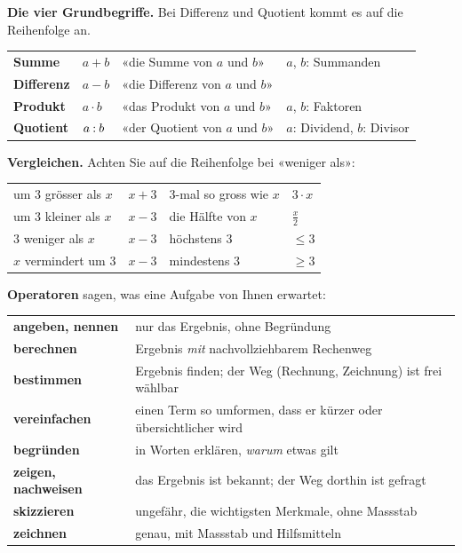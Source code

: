 \documentclass[11pt]{exam}
\begin{document}
\begin{merke}
\textbf{Die vier Grundbegriffe.} Bei Differenz und Quotient kommt es auf die
Reihenfolge an.

\begin{center}
\renewcommand{\arraystretch}{1.3}
\begin{tabular}{llll}
  \textbf{Summe}      & $a + b$           & «die Summe von $a$ und $b$»      & $a$, $b$: Summanden \\
  \textbf{Differenz}  & $a - b$           & «die Differenz von $a$ und $b$»  & \\
  \textbf{Produkt}    & $a \cdot b$       & «das Produkt von $a$ und $b$»    & $a$, $b$: Faktoren \\
  \textbf{Quotient}   & $a \mathbin{:} b$    & «der Quotient von $a$ und $b$»   & $a$: Dividend, $b$: Divisor
\end{tabular}
\end{center}

\textbf{Vergleichen.} Achten Sie auf die Reihenfolge bei «weniger als»:

\begin{center}
\renewcommand{\arraystretch}{1.3}
\begin{tabular}{ll@{\qquad}ll}
  um $3$ grösser als $x$      & $x + 3$  & $3$-mal so gross wie $x$ & $3 \cdot x$ \\
  um $3$ kleiner als $x$      & $x - 3$  & die Hälfte von $x$       & $\frac{x}{2}$ \\
  $3$ weniger als $x$         & $x - 3$  & höchstens $3$            & $\leq 3$ \\
  $x$ vermindert um $3$       & $x - 3$  & mindestens $3$           & $\geq 3$
\end{tabular}
\end{center}
\end{merke}

\begin{merke}
\textbf{Operatoren} sagen, was eine Aufgabe von Ihnen erwartet:

\begin{center}
\renewcommand{\arraystretch}{1.3}
\begin{tabular}{@{}lp{11cm}@{}}
  \textbf{angeben, nennen}   & nur das Ergebnis, ohne Begründung \\
  \textbf{berechnen}         & Ergebnis \emph{mit} nachvollziehbarem Rechenweg \\
  \textbf{bestimmen}         & Ergebnis finden; der Weg (Rechnung, Zeichnung) ist frei wählbar \\
  \textbf{vereinfachen}      & einen Term so umformen, dass er kürzer oder übersichtlicher wird \\
  \textbf{begründen}         & in Worten erklären, \emph{warum} etwas gilt \\
  \textbf{zeigen, nachweisen}& das Ergebnis ist bekannt; der Weg dorthin ist gefragt \\
  \textbf{skizzieren}        & ungefähr, die wichtigsten Merkmale, ohne Massstab \\
  \textbf{zeichnen}          & genau, mit Massstab und Hilfsmitteln
\end{tabular}
\end{center}
\end{merke}
\end{document}
